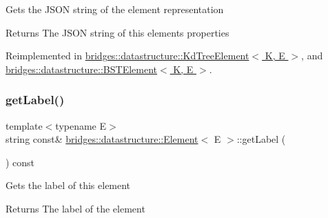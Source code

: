 Gets the J\+S\+ON string of the element representation \begin{DoxyReturn}{Returns}
The J\+S\+ON string of this element\textquotesingle{}s properties 
\end{DoxyReturn}


Reimplemented in \hyperlink{classbridges_1_1datastructure_1_1_kd_tree_element_a5413ecaf152e3df5fb45dd85da812888}{bridges\+::datastructure\+::\+Kd\+Tree\+Element$<$ K, E $>$}, and \hyperlink{classbridges_1_1datastructure_1_1_b_s_t_element_a8f962a01b6e0eff59abeee7768264fd9}{bridges\+::datastructure\+::\+B\+S\+T\+Element$<$ K, E $>$}.

\mbox{\label{classbridges_1_1datastructure_1_1_element_a44949edf79379a4d48490e98c15992a6}} 
\subsubsection{\texorpdfstring{get\+Label()}{getLabel()}}
{\footnotesize\ttfamily template$<$typename E$>$ \\
string const\& \hyperlink{classbridges_1_1datastructure_1_1_element}{bridges\+::datastructure\+::\+Element}$<$ E $>$\+::get\+Label (\begin{DoxyParamCaption}{ }\end{DoxyParamCaption}) const\hspace{0.3cm}{\ttfamily [inline]}}

Gets the label of this element \begin{DoxyReturn}{Returns}
The label of the element 
\end{DoxyReturn}
\mbox{\label{classbridges_1_1datastructure_1_1_element_a0d43c0aaa96192b49dfc0a499d63a325}} 
